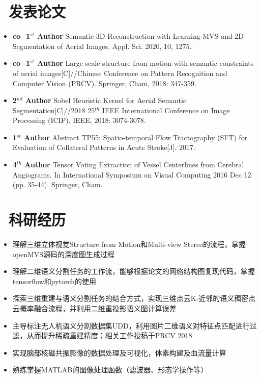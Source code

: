 \documentclass{resume}
\begin{document}
\section{\faBookmark\ 发表论文}
\begin{itemize}
    \item \textbf{co$-$1$^{st}$ Author} Semantic 3D Reconstruction with Learning MVS and 2D Segmentation of Aerial Images. Appl. Sci. 2020, 10, 1275. 
    \item \textbf{co$-$1$^{st}$ Author} Large-scale structure from motion with semantic constraints of aerial images[C]//Chinese Conference on Pattern Recognition and Computer Vision (PRCV). Springer, Cham, 2018: 347-359.
	\item \textbf{2$^{nd}$ Author} Sobel Heuristic Kernel for Aerial Semantic Segmentation[C]//2018 25$^{th}$ IEEE International Conference on Image Processing (ICIP). IEEE, 2018: 3074-3078.
	\item \textbf{1$^{st}$ Author} Abstract TP55: Spatio-temporal Flow Tractography (SFT) for Evaluation of Collateral Patterns in Acute Stroke[J]. 2017.
	\item \textbf{4$^{th}$ Author} Tensor Voting Extraction of Vessel Centerlines from Cerebral Angiograms. In International Symposium on Visual Computing 2016 Dec 12 (pp. 35-44). Springer, Cham. 
\end{itemize}


\section{\faFlask\ 科研经历}

\begin{itemize}
    \item 理解三维立体视觉Structure from Motion和Multi-view Stereo的流程，掌握openMVS源码的深度图生成过程
    \item 理解二维语义分割任务的工作流，能够根据论文的网络结构图复现代码，掌握tensorflow和pytorch的使用
    \item 探索三维重建与语义分割任务的结合方式，实现三维点云K-近邻的语义稠密点云概率融合流程，并利用二维重投影语义图计算误差
	\item 主导标注无人机语义分割数据集UDD，利用图片二维语义对特征点匹配进行过滤，从而提升稀疏重建精度；相关工作投稿于PRCV 2018
\end{itemize}

\begin{itemize}[parsep=0.5ex]
  \item 实现脑部核磁共振影像的数据处理及可视化，体素构建及血流量计算
  \item 熟练掌握MATLAB的图像处理函数（滤波器、形态学操作等）
\end{itemize}
\end{document}
